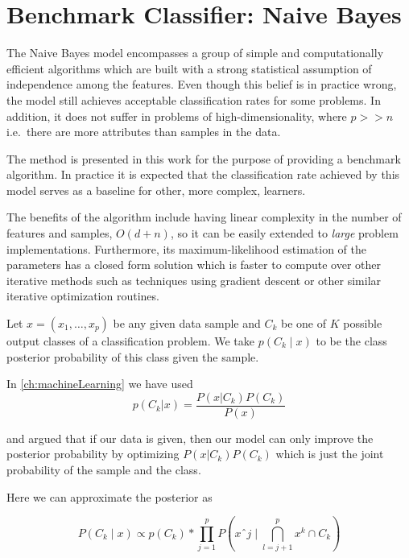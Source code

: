 \section{Benchmark Classifier: Naive Bayes}\label{section:naive_bayes}

The Naive Bayes model encompasses a group of simple and computationally efficient algorithms which are built with a strong statistical assumption of independence among the features.
Even though this belief is in practice wrong, the model still achieves acceptable classification rates for some problems.
In addition, it does not suffer in problems of high-dimensionality, where $p >> n$ i.e.\ there are more attributes than samples in the data.

The method is presented in this work for the purpose of providing a benchmark algorithm.
In practice it is expected that the classification rate achieved by this model serves as a baseline for other, more complex, learners.

The benefits of the algorithm include having linear complexity in the number of features and samples, $O(d+n)$, so it can be easily extended to \textit{large} problem implementations.
Furthermore, its maximum-likelihood estimation of the parameters has a closed form solution which is faster to compute over other iterative methods such as techniques using gradient descent or other similar iterative optimization routines.

Let $x = (x_1,\ldots,x_p)$ be any given data sample and $C_k$ be one of $K$ possible output classes of a classification problem.
We take $p(C_k \mid x)$ to be the class posterior probability of this class given the sample.

In \cref{ch:machineLearning}
we have used
\begin{equation}
\label{eq:posteriorProbabilties}
p(C_k| x) = \frac{P(x|C_k)P(C_k)}{P(x)}
\end{equation}


and argued that if our data is given, then our model can only improve the posterior probability by optimizing $P(x|C_k)P(C_k)$ which is just the joint probability of the sample and the class.

Here we can approximate the posterior as

\begin{equation}
\label{eq:posteriorProbabilityDecomposition1}
P(C_k \mid x) \propto p(C_k) * \prod_{j=1}^{p}  P(xˆj \mid \bigcap_{l=j+1}^{p} x^k \cap C_k)
\end{equation}


